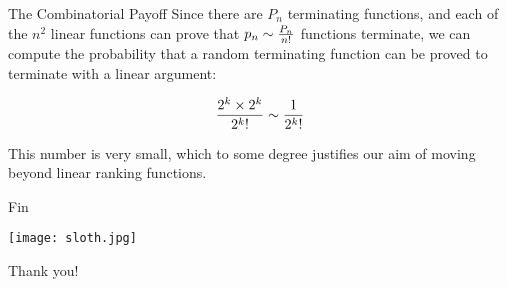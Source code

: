 \documentclass[xcolor=pdftex,t,11pt]{beamer}
\begin{document}
\begin{frame}{The Combinatorial Payoff}
Since there are $P_n$ terminating functions, and each of the $n^2$ linear functions can prove that
$p_n \sim {P_n \over n!}$ functions terminate, we can compute the probability that a random terminating
function can be proved to terminate with a linear argument:

$${2^k \times 2^k \over {2^k}!} \sim {1 \over {2^k}!}$$

\pause

\vspace{1em}

This number is very small, which to some degree justifies our aim of moving beyond linear ranking functions.

\end{frame}


\begin{frame}[fragile]{Fin}

\begin{center}
\texttt{[image: sloth.jpg]}

\Huge
 Thank you!
\end{center}

\end{frame}
\end{document}
